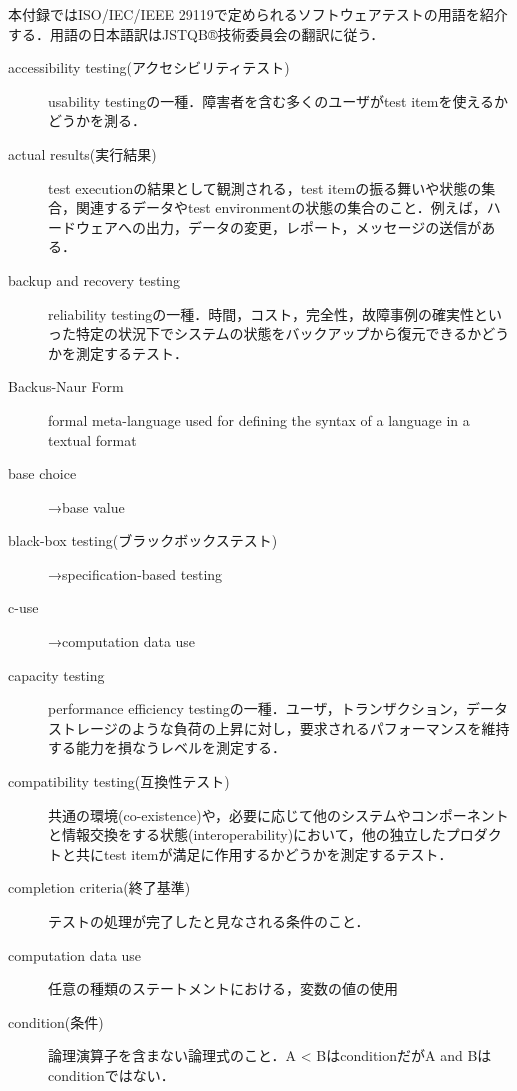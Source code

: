 本付録ではISO/IEC/IEEE 29119\cite{ieee29119-1}\cite{ieee29119-2}\cite{ieee29119-3}\cite{ieee29119-4}\cite{ieee29119-5}で定められるソフトウェアテストの用語を紹介する．用語の日本語訳はJSTQB®技術委員会の翻訳\cite{jstqb_words}に従う．

\begin{description}
    \item[accessibility testing(アクセシビリティテスト)]usability testingの一種．障害者を含む多くのユーザがtest itemを使えるかどうかを測る．
    \item[actual results(実行結果)]test executionの結果として観測される，test itemの振る舞いや状態の集合，関連するデータやtest environmentの状態の集合のこと．例えば，ハードウェアへの出力，データの変更，レポート，メッセージの送信がある．
    \item[backup and recovery testing]reliability testingの一種．時間，コスト，完全性，故障事例の確実性といった特定の状況下でシステムの状態をバックアップから復元できるかどうかを測定するテスト．
    \item[Backus-Naur Form]formal meta-language used for defining the syntax of a language in a textual format
    \item[base choice]→base value
    \item[black-box testing(ブラックボックステスト)]→specification-based testing
    \item[c-use]→computation data use
    \item[capacity testing]performance efficiency testingの一種．ユーザ，トランザクション，データストレージのような負荷の上昇に対し，要求されるパフォーマンスを維持する能力を損なうレベルを測定する．
    \item[compatibility testing(互換性テスト)]共通の環境(co-existence)や，必要に応じて他のシステムやコンポーネントと情報交換をする状態(interoperability)において，他の独立したプロダクトと共にtest itemが満足に作用するかどうかを測定するテスト．
    \item[completion criteria(終了基準)]テストの処理が完了したと見なされる条件のこと．
    \item[computation data use]任意の種類のステートメントにおける，変数の値の使用
    \item[condition(条件)]論理演算子を含まない論理式のこと．{\sf A < B}はconditionだが{\sf A and B}はconditionではない．

\end{description}
